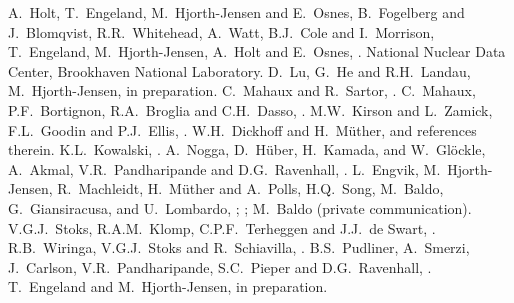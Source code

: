 \begin{thebibliography}{200}
A.\ Holt, T.\ Engeland, M.\ Hjorth-Jensen and E.\ Osnes,
B.~Fogelberg and J.~Blomqvist, 
R.R.\ Whitehead, A.\ Watt, B.J.\ Cole and I.\ Morrison, 
T.\ Engeland, M.\ Hjorth-Jensen, A.\ Holt and E.\ Osnes,
.
 National Nuclear Data Center, Brookhaven National Laboratory.
 D.\ Lu, G.\ He and R.H.\ Landau, 
 M.\ Hjorth-Jensen, 
in preparation.
 C.\ Mahaux and R.\ Sartor, 
.
C.\ Mahaux, P.F.\ Bortignon, R.A.\ Broglia and C.H.\ Dasso,
.
 M.W.\ Kirson and L.\ Zamick, 
 F.L.\ Goodin and P.J.\ Ellis,
.
W.H.\ Dickhoff and H.\ M\"{u}ther, 
and references therein.
K.L.\ Kowalski, %
.
A.\ Nogga, D.\ H\"uber, H.\ Kamada, and W.\ Gl\"ockle, 
A.\ Akmal, V.R.\ Pandharipande and D.G.\ Ravenhall, 
.
L.\ Engvik, M.\ Hjorth-Jensen, R.\ Machleidt, H.\ M\"uther and A.\ Polls,
H.Q.\ Song, M.\ Baldo, G.\ Giansiracusa, and U.\ Lombardo, 
;
;
                  M.\ Baldo (private communication).
V.G.J.\ Stoks, R.A.M.\ Klomp, C.P.F.\ Terheggen and J.J.\ de Swart, 
.
 R.B.\ Wiringa, V.G.J.\ Stoks 
                 and R.\ Schiavilla, 
.
B.S.\ Pudliner, A.\ Smerzi, J.\ Carlson, V.R.\ Pandharipande, S.C.\ Pieper 
and  D.G.\ Ravenhall, 
.
 T.\ Engeland and M.\ Hjorth-Jensen, in preparation.

\end{thebibliography}


